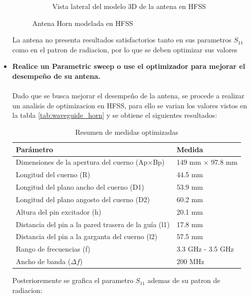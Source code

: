 \begin{itemize}
\begin{figure}[H]
\begin{subfigure}[b]{0.45\textwidth}
			\caption{Vista lateral del modelo 3D de la antena en HFSS}
			\label{fig:Imagen-Londres}
		\end{subfigure}
		\caption{Antena Horn modelada en HFSS}
		\label{fig:Figura-Ciudades}
	\end{figure}
	La antena no presenta resultados satisfactorios tanto en sus parametros $S_{11}$ como en el patron de radiacion, por lo que se deben optimizar sus valores
	\newpage
	\item \textbf{Realice un Parametric sweep o use el optimizador para mejorar el desempeño de su
	antena.}\\\\
	Dado que se busca mejorar el desempeño de la antena, se procede a realizar un analisis de optimizacion en HFSS, para ello se varian los valores vistos en la tabla \ref{tab:waveguide_horn} y se obtiene el siguientes resultados:
	\begin{table}[H]
		\centering
		\begin{tabular}{|l|l|}
		\hline
		\textbf{Parámetro}                                   & \textbf{Medida}              \\ \hline
		Dimensiones de la apertura del cuerno (Ap×Bp)       & 149 mm × 97.8 mm            \\ \hline
		Longitud del cuerno (R)                             & 44.5 mm                     \\ \hline
		Longitud del plano ancho del cuerno (D1)            & 53.9 mm                     \\ \hline
		Longitud del plano angosto del cuerno (D2)          & 60.2 mm                     \\ \hline
		Altura del pin excitador (h)                        & 20.1 mm                     \\ \hline
		Distancia del pin a la pared trasera de la guía (l1)& 17.8 mm                     \\ \hline
		Distancia del pin a la garganta del cuerno (l2)     & 57.5 mm                     \\ \hline
		Rango de frecuencias (f)                            & 3.3 GHz - 3.5 GHz         \\ \hline
		Ancho de banda ($\Delta f$)                         & 200 MHz                     \\ \hline
		\end{tabular}
		\caption{Resumen de medidas optimizadas}
		\label{tab:waveguide_horn_adjusted}
		\end{table}
		Posterioremente se grafica el parametro $S_{11}$ ademas de su patron de radiacion:

\end{itemize}
